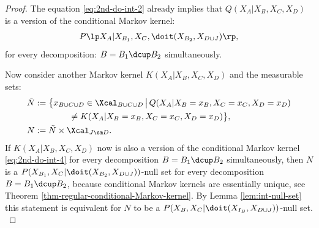 \begin{Prp}
\begin{proof}
The equation \ref{eq:2nd-do-int-2} already implies that $Q(X_A|X_B,X_C,X_D)$ is a version of the conditional Markov kernel:
\begin{align} P\lp X_A|X_{B_1},X_C,\doit(X_{B_2},X_{D\cup J})\rp, \label{eq:2nd-do-int-4} 
\end{align}
for every decomposition: $B=B_1 \dcup B_2$ simultaneously.

Now consider another Markov kernel $K(X_A|X_B,X_C,X_D)$ and the measurable sets:
\begin{align*}
    \tilde N &:= \bigl\{ x_{B \cup C \cup D} \in \Xcal_{B \cup C \cup D} \,\big|\,  Q(X_A|X_B=x_B,X_C=x_C,X_D=x_D) \\ 
    & \qquad \qquad  \neq K(X_A|X_B=x_B,X_C=x_C,X_D=x_D)  \bigr\},\\
  N &:= \tilde N \times \Xcal_{J \sm D}.
\end{align*}
If $K(X_A|X_B,X_C,X_D)$ now is also a version of the conditional Markov kernel \ref{eq:2nd-do-int-4} 
for every decomposition $B=B_1 \dcup B_2$ simultaneously, then $N$ is a 
$P(X_{B_1},X_C|\doit(X_{B_2},X_{D\cup J}))$-null set for every decomposition $B=B_1 \dcup B_2$, 
because conditional Markov kernels are essentially unique, see Theorem \ref{thm-regular-conditional-Markov-kernel}. 
By Lemma \ref{lem:int-null-set} this statement is equivalent for $N$ to be a 
$P(X_B,X_C|\doit(X_{I_B},X_{D\cup J}))$-null set.\\



\end{proof}
\end{Prp}

